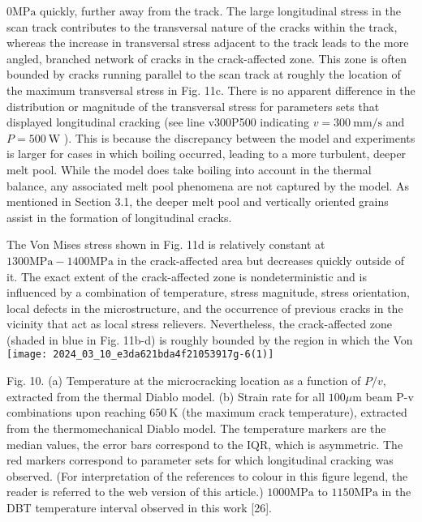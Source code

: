 \documentclass[10pt]{article}
\begin{document}
$0 \mathrm{MPa}$ quickly, further away from the track. The large longitudinal stress in the scan track contributes to the transversal nature of the cracks within the track, whereas the increase in transversal stress adjacent to the track leads to the more angled, branched network of cracks in the crack-affected zone. This zone is often bounded by cracks running parallel to the scan track at roughly the location of the maximum transversal stress in Fig. 11c. There is no apparent difference in the distribution or magnitude of the transversal stress for parameters sets that displayed longitudinal cracking (see line v300P500 indicating $v=300 \mathrm{~mm} / \mathrm{s}$ and $P=500 \mathrm{~W}$ ). This is because the discrepancy between the model and experiments is larger for cases in which boiling occurred, leading to a more turbulent, deeper melt pool. While the model does take boiling into account in the thermal balance, any associated melt pool phenomena are not captured by the model. As mentioned in Section 3.1, the deeper melt pool and vertically oriented grains assist in the formation of longitudinal cracks.

The Von Mises stress shown in Fig. 11d is relatively constant at $1300 \mathrm{MPa}-1400 \mathrm{MPa}$ in the crack-affected area but decreases quickly outside of it. The exact extent of the crack-affected zone is nondeterministic and is influenced by a combination of temperature, stress magnitude, stress orientation, local defects in the microstructure, and the occurrence of previous cracks in the vicinity that act as local stress relievers. Nevertheless, the crack-affected zone (shaded in blue in Fig. 11b-d) is roughly bounded by the region in which the Von\\
\texttt{[image: 2024\_03\_10\_e3da621bda4f21053917g-6(1)]}

Fig. 10. (a) Temperature at the microcracking location as a function of $P / v$, extracted from the thermal Diablo model. (b) Strain rate for all $100 \mu \mathrm{m}$ beam P-v combinations upon reaching $650 \mathrm{~K}$ (the maximum crack temperature), extracted from the thermomechanical Diablo model. The temperature markers are the median values, the error bars correspond to the IQR, which is asymmetric. The red markers correspond to parameter sets for which longitudinal cracking was observed. (For interpretation of the references to colour in this figure legend, the reader is referred to the web version of this article.) $1000 \mathrm{MPa}$ to $1150 \mathrm{MPa}$ in the DBT temperature interval observed in this work [26].
\end{document}
